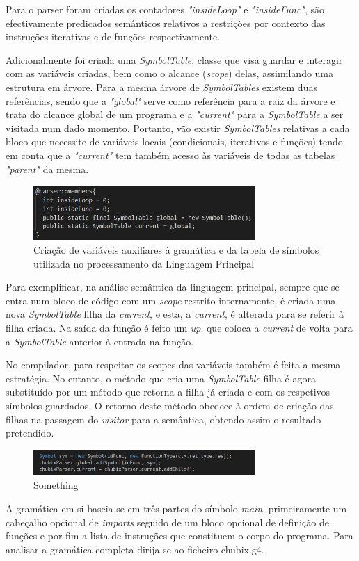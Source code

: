 \documentclass[10pt,portuguese]{article}
\begin{document}
\par Para o parser foram criadas os contadores \emph{"insideLoop"} e \emph{"insideFunc"}, são efectivamente predicados semânticos relativos a restrições por contexto das instruções iterativas e de funções respectivamente.
\par Adicionalmente foi criada uma \emph{SymbolTable}, classe que visa guardar e interagir com as variáveis criadas, bem como o alcance (\emph{scope}) delas, assimilando uma estrutura em árvore. Para a mesma árvore de \emph{SymbolTables} existem duas referências, sendo que a \emph{"global"} serve como referência para a raiz da árvore e trata do alcance global de um programa e a \emph{"current"} para a \emph{SymbolTable} a ser visitada num dado momento. Portanto, vão existir \emph{SymbolTables} relativas a cada bloco que necessite de variáveis locais (condicionais, iterativos e funções) tendo em conta que a \emph{"current"} tem também acesso às variáveis de todas as tabelas \emph{"parent"} da mesma.
\begin{figure}[h]
\centering
\includegraphics[width=0.75\textwidth]{images/parserchubix.png}
\caption{Criação de variáveis auxiliares à gramática e da tabela de símbolos utilizada no processamento da Linguagem Principal}
\end{figure}
\par Para exemplificar, na análise semântica da linguagem principal, sempre que se entra num bloco de código com um \emph{scope} restrito internamente, é criada uma nova \emph{SymbolTable} filha da \emph{current}, e esta, a \emph{current}, é alterada para se referir à filha criada. Na saída da função é feito um \emph{up}, que coloca a \emph{current} de volta para a \emph{SymbolTable} anterior à entrada na função.
\par No compilador, para respeitar os scopes das variáveis também é feita a mesma estratégia. No entanto, o método que cria uma \emph{SymbolTable} filha é agora substituído por um método que retorna a filha já criada e com os respetivos símbolos guardados. O retorno deste método obedece à ordem de criação das filhas na passagem do \emph{visitor} para a semântica, obtendo assim o resultado pretendido.
\begin{figure}[h]
\centering
\includegraphics[width=0.75\textwidth]{images/unknown.png}
\caption{Something}
\end{figure}
\par A gramática em si baseia-se em três partes do símbolo \emph{main}, primeiramente um cabeçalho opcional de \emph{imports} seguido de um bloco opcional de definição de funções e por fim a lista de instruções que constituem o corpo do programa. Para analisar a gramática completa dirija-se ao ficheiro chubix.g4.
\end{document}
